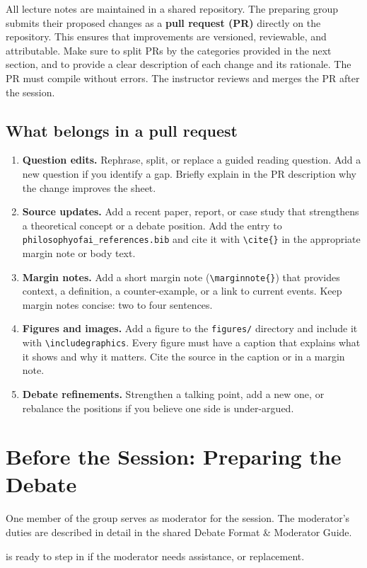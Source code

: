  All lecture notes
are maintained in a shared repository. The preparing group submits their
proposed changes as a \textbf{pull request (PR)} directly on the
repository. This ensures that improvements are versioned, reviewable,
and attributable. Make sure to split PRs by the categories provided in the next section,
and to provide a clear description of each change and its rationale. The PR must compile without errors. 
The instructor reviews and merges the PR after the session.

\subsection*{What belongs in a pull request}

\begin{enumerate}
    \item \textbf{Question edits.} Rephrase, split, or replace a guided
          reading question. Add a new question if you identify a gap.
          Briefly explain in the PR description why the change improves the
          sheet.

    \item \textbf{Source updates.} Add a recent paper, report, or case
          study that strengthens a theoretical concept or a debate position.
          Add the entry to \texttt{philosophyofai\_references.bib} and cite
          it with \texttt{\textbackslash cite\{\}} in the appropriate margin
          note or body text.

    \item \textbf{Margin notes.} Add a short margin note
          (\texttt{\textbackslash marginnote\{\}}) that provides context,
          a definition, a counter-example, or a link to current events.
          Keep margin notes concise: two to four sentences.

    \item \textbf{Figures and images.} Add a figure to the
          \texttt{figures/} directory and include it with
          \texttt{\textbackslash includegraphics}. Every figure must have a
          caption that explains what it shows and why it matters. Cite the
          source in the caption or in a margin note.

    \item \textbf{Debate refinements.} Strengthen a talking point, add a
          new one, or rebalance the positions if you believe one side is
          under-argued.
\end{enumerate}

\section*{Before the Session: Preparing the Debate}

 One member of the
group serves as moderator for the session. The moderator's duties are
described in detail in the shared Debate Format \& Moderator Guide.

 is ready to step in if the moderator needs assistance, or replacement.

